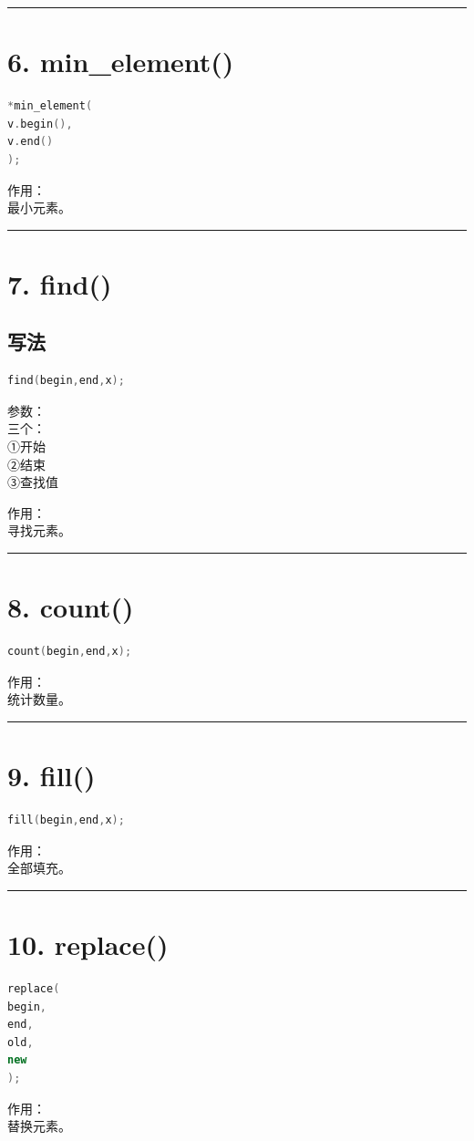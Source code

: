 \documentclass[9pt,twocolumn]{extarticle}
\begin{document}
\noindent\rule{\linewidth}{0.4pt}

\section{6. min\_element()}
\begin{lstlisting}[language=C++]
*min_element(
v.begin(),
v.end()
);
\end{lstlisting}
作用：\\
最小元素。

\noindent\rule{\linewidth}{0.4pt}

\section{7. find()}

\subsection{写法}
\begin{lstlisting}[language=C++]
find(begin,end,x);
\end{lstlisting}
参数：\\
三个：\\
①开始\\
②结束\\
③查找值

作用：\\
寻找元素。

\noindent\rule{\linewidth}{0.4pt}

\section{8. count()}
\begin{lstlisting}[language=C++]
count(begin,end,x);
\end{lstlisting}
作用：\\
统计数量。

\noindent\rule{\linewidth}{0.4pt}

\section{9. fill()}
\begin{lstlisting}[language=C++]
fill(begin,end,x);
\end{lstlisting}
作用：\\
全部填充。

\noindent\rule{\linewidth}{0.4pt}

\section{10. replace()}
\begin{lstlisting}[language=C++]
replace(
begin,
end,
old,
new
);
\end{lstlisting}
作用：\\
替换元素。
\end{document}
